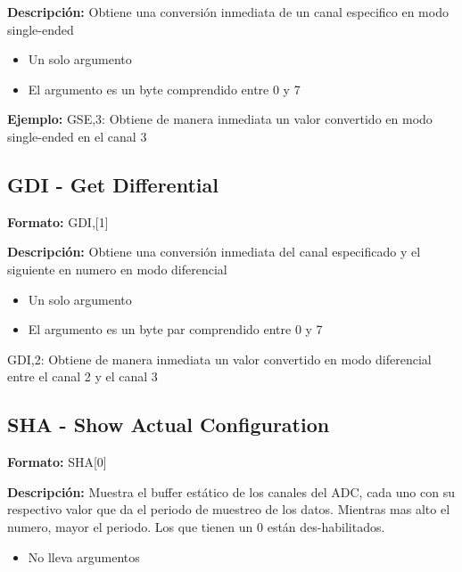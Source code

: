\textbf{Descripción:}
Obtiene una conversión inmediata de un canal especifico en modo single-ended

\begin{itemize}
  \item Un solo argumento
  \item El argumento es un byte comprendido entre 0 y 7
\end{itemize}

\textbf{Ejemplo:}
GSE,3: Obtiene de manera inmediata un valor convertido en modo single-ended en el canal 3


\subsection{GDI - Get Differential} %
\label{sub:gdi_get_differential}
\textbf{Formato:} GDI,[1]

\textbf{Descripción:}
Obtiene una conversión inmediata del canal especificado y el siguiente en numero en modo diferencial

\begin{itemize}
  \item Un solo argumento
  \item El argumento es un byte par comprendido entre 0 y 7
\end{itemize}

GDI,2: Obtiene de manera inmediata un valor convertido en modo diferencial entre el canal 2 y el canal 3 

\subsection{SHA - Show Actual Configuration} %
\label{sub:sha_show_actual_configuration}
\textbf{Formato:} SHA[0]

\textbf{Descripción:}
Muestra el buffer estático de los canales del ADC, cada uno con su respectivo valor que da el periodo de muestreo de los datos. Mientras mas alto el numero, mayor el periodo. Los que tienen un 0 están des-habilitados.

\begin{itemize}
  \item No lleva argumentos
\end{itemize}


